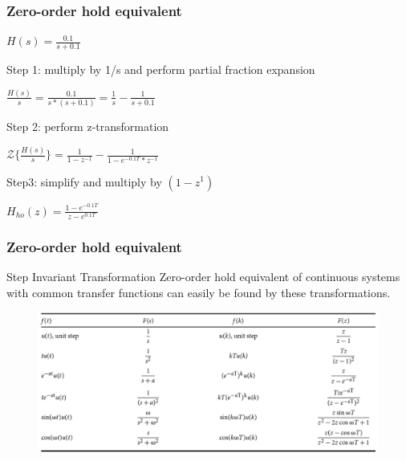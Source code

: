\begin{frame}
	\frametitle{Zero-order hold equivalent}
	\begin{example}
		\begin{center}
			$H(s) = \frac{0.1}{s + 0.1}$
		\end{center}
		Step 1: multiply by 1/s and perform partial fraction expansion
		\begin{center}
			$\frac{H(s)}{s} = \frac{0.1}{s * (s + 0.1)} = \frac{1}{s} - \frac{1}{s + 0.1}$
		\end{center}
		Step 2: perform z-transformation
		\begin{center}
			$\mathcal{Z} \{\frac{H(s)}{s}\} = \frac{1}{1 - z^{-1}} - \frac{1}{1 - e^{-0.1T} * z^{-1}}$
		\end{center}
		Step3: simplify and multiply by $(1-z^{1})$
		\begin{center}
			$H_{ho}(z) = \frac{1 - e^{-0.1T}}{z - e^{0.1T}}$
		\end{center}
	\end{example}
\end{frame}

\begin{frame}
	\frametitle{Zero-order hold equivalent}
	\begin{block}{Step Invariant Transformation}
		Zero-order hold equivalent of continuous systems with common transfer functions can easily be found by these transformations.
		\vspace{-1em}
		\begin{figure}
			\centering
			\includegraphics[width=1\linewidth]{step_inv}
		\end{figure}
	\end{block}
\end{frame}

